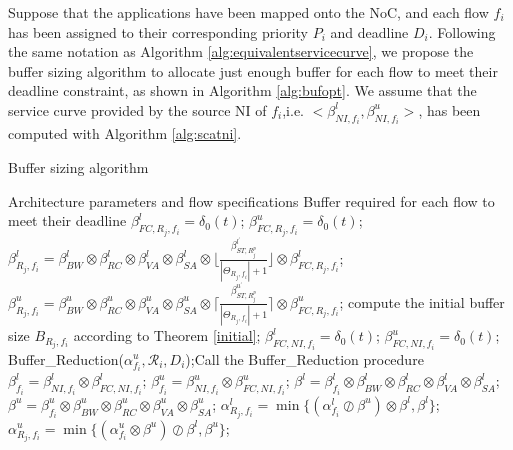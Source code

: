 \documentclass[preprint]{elsarticle}
\begin{document}
Suppose that the applications have been mapped onto the NoC, and each flow $f_i$ has been assigned to their corresponding priority $P_i$ and deadline $D_i$. Following the same notation as Algorithm \ref{alg:equivalentservicecurve}, we propose the buffer sizing algorithm to allocate just enough buffer for each flow to meet their deadline constraint, as shown in Algorithm \ref{alg:bufopt}. We assume that the service curve provided by the source NI of $f_i$,i.e. $<\beta_{NI,f_i}^l,\beta_{NI,f_i}^u>$, has been computed with Algorithm \ref{alg:scatni}.
\begin{algorithm}[!h]
\caption{Buffer sizing algorithm}
\label{alg:bufopt}
\begin{algorithmic}[1]
\Require Architecture parameters and flow specifications
\Ensure Buffer required for each flow to meet their deadline
            \State $\beta_{FC,R_j,f_i}^l=\delta_0(t)$; $\beta_{FC,R_j,f_i}^u=\delta_0(t)$;
            \State $\beta_{R_j,f_i}^l=\beta_{BW}^l\otimes\beta_{RC}^l\otimes\beta_{VA}^l\otimes\beta_{SA}^l\otimes\lfloor\frac{\beta_{ST,R_j^{p}}^{l^\prime}}{|\Theta_{R_j,f_i}|+1}\rfloor\otimes\beta_{FC,R_j,f_i}^l$;
            \State $\beta_{R_j,f_i}^u=\beta_{BW}^u\otimes\beta_{RC}^u\otimes\beta_{VA}^u\otimes\beta_{SA}^u\otimes\lceil\frac{\beta_{ST,R_j^{p}}^{u^\prime}}{|\Theta_{R_j,f_i}|+1}\rceil\otimes\beta_{FC,R_j,f_i}^u$;
            \State compute the initial buffer size $B_{R_j,f_i}$ according to Theorem \ref{initial};
        \EndFor
        \State $\beta_{FC,NI,f_i}^l=\delta_0(t)$; $\beta_{FC,NI,f_i}^u=\delta_0(t)$;
        \State Buffer\_Reduction($\alpha^u_{f_i},\mathcal{R}_i,D_i$);\Comment Call the Buffer\_Reduction procedure
        \State $\beta_{f_i}^l=\beta_{NI,f_i}^l\otimes\beta_{FC,NI,f_i}^l$; $\beta_{f_i}^u=\beta_{NI,f_i}^u\otimes\beta_{FC,NI,f_i}^u$;
                \State $\beta^l=\beta^l_{f_i}\otimes\beta_{BW}^l\otimes\beta_{RC}^l\otimes\beta_{VA}^l\otimes\beta_{SA}^l$;
                \State $\beta^u=\beta^u_{f_i}\otimes\beta_{BW}^u\otimes\beta_{RC}^u\otimes\beta_{VA}^u\otimes\beta_{SA}^u$;
                \State $\alpha^l_{R_j,f_i}=\min\{(\alpha^l_{f_i}\oslash\beta^u)\otimes\beta^l,\beta^l\}$;
                \State $\alpha^u_{R_j,f_i}=\min\{(\alpha^u_{f_i}\otimes\beta^u)\oslash\beta^l,\beta^u\}$;

\end{algorithmic}
\end{algorithm}
\end{document}
